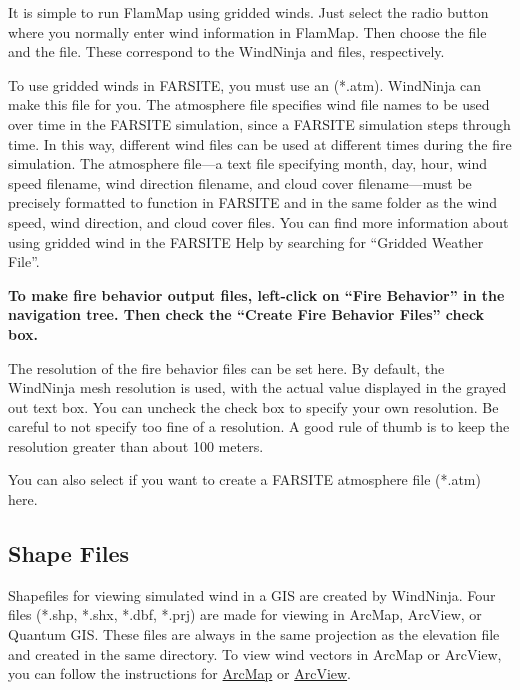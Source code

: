 \documentclass[12pt]{article}
\begin{document}
It is simple to run FlamMap using gridded winds.  Just select the  radio button where you normally enter wind information in FlamMap.  Then choose the  file and the  file.  These correspond to the WindNinja  and  files, respectively.

To use gridded winds in FARSITE, you must use an  (*.atm).  WindNinja can make this file for you.  The atmosphere file specifies wind file names to be used over time in the FARSITE simulation, since a FARSITE simulation steps through time.  In this way, different wind files can be used at different times during the fire simulation.  The atmosphere file—a text file specifying month, day, hour, wind speed filename, wind direction filename, and cloud cover filename—must be precisely formatted to function in FARSITE and in the same folder as the wind speed, wind direction, and cloud cover files.  You can find more information about using gridded wind in the FARSITE Help by searching for “Gridded Weather File”.

\textbf{\color{red} To make fire behavior output files, left-click on “Fire Behavior” in the navigation tree.  Then check the “Create Fire Behavior Files” check box.}

The resolution of the fire behavior files can be set here.  By default, the WindNinja mesh resolution is used, with the actual value displayed in the grayed out text box.  You can uncheck the  check box to specify your own resolution.  Be careful to not specify too fine of a resolution.  A good rule of thumb is to keep the resolution greater than about 100 meters.

You can also select if you want to create a FARSITE atmosphere file (*.atm) here.

\subsection{Shape Files}
Shapefiles for viewing simulated wind in a GIS are created by WindNinja.  Four files (*.shp, *.shx, *.dbf, *.prj) are made for viewing in ArcMap, ArcView, or Quantum GIS.  These files are always in the same projection as the elevation file and created in the same directory.  To view wind vectors in ArcMap or ArcView, you can follow the instructions for \href{https://weather.firelab.org/windninja/tutorials/ArcGIS.pdf}{ArcMap} or \href{http://firelab.github.io/windninja/pdf/displaying_wind_vectors_in_ArcView.pdf}{ArcView}.
\end{document}
